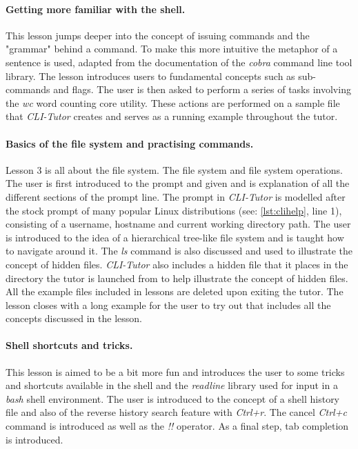 \paragraph{Getting more familiar with the shell.} This lesson jumps deeper into
the concept of issuing commands and the "grammar" behind a command. To make
this more intuitive the metaphor of a sentence is used, adapted from the
documentation of the \textit{cobra} command line tool
library\cite{franciacobra}. The lesson introduces users to fundamental concepts
such as sub-commands and flags. The user is then asked to perform a series of
tasks involving the \textit{wc} word counting core utility. These actions are
performed on a sample file that \textit{CLI-Tutor} creates and serves as a
running example throughout the tutor.

\paragraph{Basics of the file system and practising commands.} Lesson 3 is all
about the file system. The file system and file system operations. The user is
first introduced to the prompt and given and is explanation of all the different
sections of the prompt line. The prompt in \textit{CLI-Tutor} is modelled after
the stock prompt of many popular Linux distributions (see:
\autoref{lst:clihelp}, line 1), consisting of a username, hostname and current
working directory path. The user is introduced to the idea of a hierarchical
tree-like file system and is taught how to navigate around it. The \textit{ls}
command is also discussed and used to illustrate the concept of hidden files.
\textit{CLI-Tutor} also includes a hidden file that it places in the directory
the tutor is launched from to help illustrate the concept of hidden files. All
the example files included in lessons are deleted upon exiting the tutor. The
lesson closes with a long example for the user to try out that includes all the
concepts discussed in the lesson.

\paragraph{Shell shortcuts and tricks.} This lesson is aimed to be a bit more
fun and introduces the user to some tricks and shortcuts available in the shell
and the \textit{readline}\cite{ramey_fox_readline} library used for input in a
\textit{bash} shell environment. The user is introduced to the concept of a
shell history file and also of the reverse history search feature with
\textit{Ctrl+r}. The cancel \textit{Ctrl+c} command is introduced as well
as the \textit{!!} operator. As a final step, tab completion is introduced.

